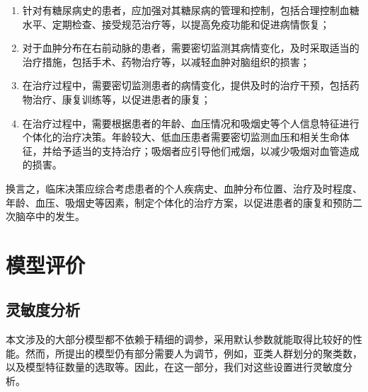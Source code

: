 \documentclass[bwprint]{gmcmthesis}
\begin{document}
\begin{enumerate}
    \item 针对有糖尿病史的患者，应加强对其糖尿病的管理和控制，包括合理控制血糖水平、定期检查、接受规范治疗等，以提高免疫功能和促进病情恢复；
    \item 对于血肿分布在右前动脉的患者，需要密切监测其病情变化，及时采取适当的治疗措施，包括手术、药物治疗等，以减轻血肿对脑组织的损害；
    \item 在治疗过程中，需要密切监测患者的病情变化，提供及时的治疗干预，包括药物治疗、康复训练等，以促进患者的康复；
    \item 在治疗过程中，需要根据患者的年龄、血压情况和吸烟史等个人信息特征进行个体化的治疗决策。年龄较大、低血压患者需要密切监测血压和相关生命体征，并给予适当的支持治疗；吸烟者应引导他们戒烟，以减少吸烟对血管造成的损害。

\end{enumerate}

换言之，临床决策应综合考虑患者的个人疾病史、血肿分布位置、治疗及时程度、年龄、血压、吸烟史等因素，制定个体化的治疗方案，以促进患者的康复和预防二次脑卒中的发生。

\clearpage
\section{模型评价}
\subsection{灵敏度分析}
本文涉及的大部分模型都不依赖于精细的调参，采用默认参数就能取得比较好的性能。然而，所提出的模型仍有部分需要人为调节，例如，亚类人群划分的聚类数，以及模型特征数量的选取等。因此，在这一部分，我们对这些设置进行灵敏度分析。
\end{document}
